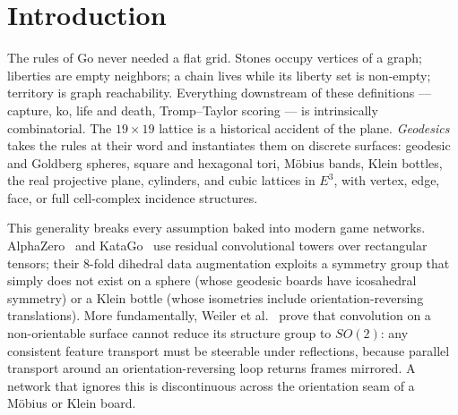 \documentclass[11pt]{article}
\begin{document}
\begin{abstract}
auxiliary head. The network is small ($4.8\times 10^4$ parameters),
dependency-free, and every gradient is hand-derived and numerically
verified. We verify the orientation cocycle against ground-truth
orientability on eleven board types, demonstrate machine-precision
equivariance on flat boards, and report the pathologies specific to this
setting --- transposition-table
ko cycles, a degenerate early-pass equilibrium under Tromp--Taylor
scoring, and the failure of index-based tie-breaking (simulation of
simplicity) to respect board symmetries when the Morse function is
learned, an obstruction we show recurs at every level of the hierarchy
(basins, persistence pairing, family merging) and resolve with
value-and-set-defined constructions throughout --- together with their
remedies. To
our knowledge this is the first game-playing agent on non-orientable
boards; a full transfer and ablation study is specified and in progress.
\end{abstract}

\section{Introduction}
The rules of Go never needed a flat grid. Stones occupy vertices of a
graph; liberties are empty neighbors; a chain lives while its liberty set
is non-empty; territory is graph reachability. Everything downstream of
these definitions --- capture, ko, life and death, Tromp--Taylor scoring
--- is intrinsically combinatorial. The $19\times 19$ lattice is a
historical accident of the plane. \emph{Geodesics} takes the rules at
their word and instantiates them on discrete surfaces: geodesic and
Goldberg spheres, square and hexagonal tori, M\"obius bands, Klein
bottles, the real projective plane, cylinders, and cubic lattices in
$E^3$, with vertex, edge, face, or full cell-complex incidence structures.

This generality breaks every assumption baked into modern game networks.
AlphaZero~\cite{silver2018} and KataGo~\cite{wu2019katago} use residual
convolutional towers over rectangular tensors; their $8$-fold dihedral
data augmentation exploits a symmetry group that simply does not exist on
a sphere (whose geodesic boards have icosahedral symmetry) or a Klein
bottle (whose isometries include orientation-reversing translations).
More fundamentally, Weiler et al.~\cite{weiler2021coordinate} prove that
convolution on a non-orientable surface cannot reduce its structure group
to $SO(2)$: any consistent feature transport must be steerable under
reflections, because parallel transport around an orientation-reversing
loop returns frames mirrored. A network that ignores this is
discontinuous across the orientation seam of a M\"obius or Klein board.
\end{document}
